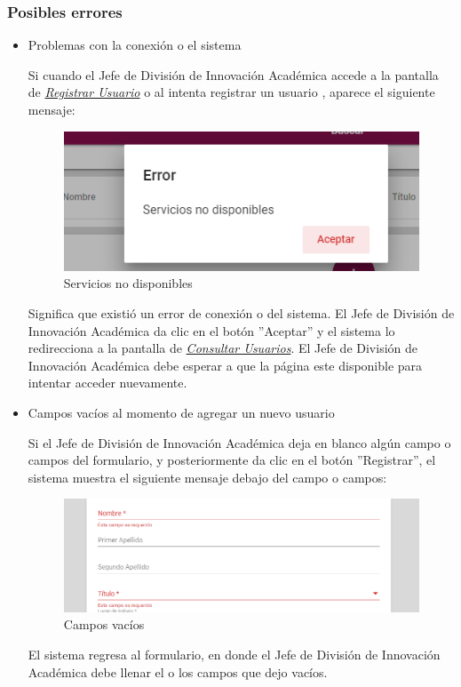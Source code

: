 \subsubsection{Posibles errores}

\begin{itemize}
	\item Problemas con la conexión o el sistema
	
	Si cuando el Jefe de División de Innovación Académica  accede a la pantalla de \hyperlink{registrarUs}{\textit{Registrar Usuario}} o al intenta registrar un usuario , aparece el siguiente mensaje:
	
	\begin{figure}[H]
		\centering
		\includegraphics[width=0.4\linewidth]{images/SP5/MSGSN}
		\caption{Servicios no disponibles}
		\label{SND}
		
	\end{figure}
	
	Significa que existió un error de conexión o del sistema. El Jefe de División de Innovación Académica  da clic en el botón ''Aceptar'' y el sistema lo redirecciona  a la pantalla de \hyperlink{consultarUs}{\textit{Consultar Usuarios}}. El Jefe de División de Innovación Académica  debe esperar a que la página este disponible para intentar acceder nuevamente.
	
	\item Campos vacíos al momento de agregar un nuevo usuario
	
	Si el Jefe de División de Innovación Académica  deja en blanco algún campo o campos del formulario, y posteriormente da clic en el botón ''Registrar'', el sistema muestra el siguiente mensaje debajo del campo o campos:
	
	\begin{figure}[H]
		\centering
		\includegraphics[width=0.4\linewidth]{images/SP5/MSG44}
		\caption{Campos vacíos}
		\label{mensaje44}
	\end{figure}
	
	El sistema regresa al formulario, en donde el Jefe de División de Innovación Académica  debe llenar el o los campos que dejo vacíos.
	

\end{itemize}
